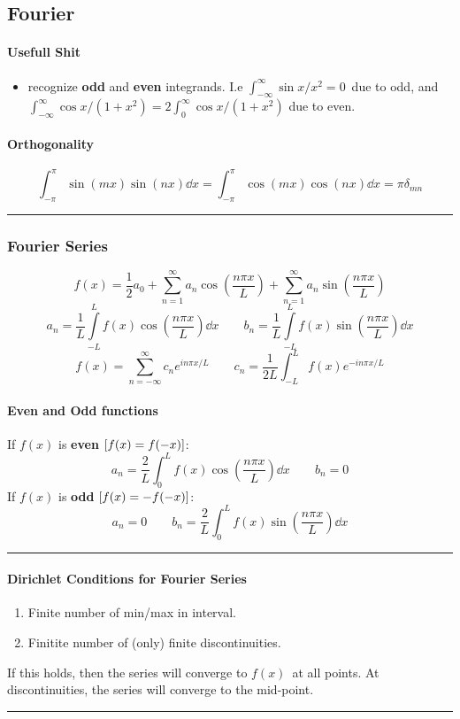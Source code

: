 \documentclass[10pt,a4paper]{article}
\renewcommand{\b}{\textbf}
\renewcommand{\exp}{e^}
\newcommand{\infint}{\int_{-\infty}^{\infty}}
\newcommand{\zeroinfint}{\int_{0}^{\infty}}
\newcommand{\oneinfsum}{\sum_{n=1}^{\infty}}
\newcommand{\holine}{\rule{286pt}{1pt}}
\newcommand{\half}{\frac{1}{2}}
\begin{document}
\begin{multicols}{2}
\newpage
\part*{Fourier}
\subsection*{Usefull Shit}
\begin{itemize}
    \item recognize \textbf{odd} and \textbf{even} integrands. I.e $\infint \sin{x}/x^2 = 0$ due to odd, and $\infint\cos{x}/(1+x^2) = 2\zeroinfint\cos{x}/(1+x^2)$ due to even.
\end{itemize}

\subsection*{Orthogonality}
\[
    \int_{-\pi}^\pi \sin(mx)\sin(nx) \dd{x} = \int_{-\pi}^\pi \cos(mx)\cos(nx) \dd{x} = \pi \delta_{mn}
\]


\holine
\section*{Fourier Series}
\[
    f(x) = \half a_0 + \oneinfsum a_n\cos(\frac{n\pi x}{L}) + \oneinfsum a_n\sin(\frac{n\pi x}{L})
\]
\[
    a_n = \frac{1}{L}\int\limits_{-L}^{L}f(x) \cos(\frac{n\pi x}{L}) \dd{x} \quad\quad
    b_n = \frac{1}{L}\int\limits_{-L}^{L}f(x) \sin(\frac{n\pi x}{L}) \dd{x}
\]
\[
    f(x) = \sum_{n=-\infty}^{\infty} c_n \exp{in\pi x/L}  \quad\quad
    c_n = \frac{1}{2L}\int_{-L}^L f(x) \exp{-in\pi x/L}
\]

\subsection*{Even and Odd functions}
If $f(x)$ is \b{even} $\qty[f(x) = f(-x)]$:
\[
    a_n = \frac{2}{L}\int_0^L f(x)\cos(\frac{n\pi x}{L}) \dd{x} \quad\quad b_n = 0
\]
If $f(x)$ is \b{odd} $\qty[f(x) = -f(-x)]$:
\[
    a_n = 0 \quad\quad b_n = \frac{2}{L}\int_0^L f(x)\sin(\frac{n\pi x}{L}) \dd{x}
\]


\holine 
\subsection*{Dirichlet Conditions for Fourier Series}
\begin{enumerate}
    \item Finite number of min/max in interval.
    \item Finitite number of (only) finite discontinuities.
\end{enumerate}
If this holds, then the series will converge to $f(x)$ at all points. At discontinuities, the series will converge to the mid-point.
\holine

\end{multicols}
\end{document}
